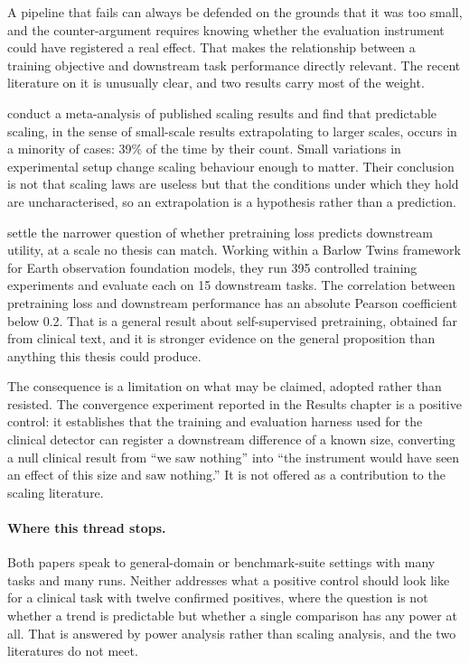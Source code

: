 A pipeline that fails can always be defended on the grounds that it was too small, and the
counter-argument requires knowing whether the evaluation instrument could have registered a
real effect. That makes the relationship between a training objective and downstream task
performance directly relevant. The recent literature on it is unusually clear, and two
results carry most of the weight.

\citet{lourie2025scaling} conduct a meta-analysis of published scaling results and find that
predictable scaling, in the sense of small-scale results extrapolating to larger scales,
occurs in a minority of cases: 39\% of the time by their count. Small variations in
experimental setup change scaling behaviour enough to matter. Their conclusion is not that
scaling laws are useless but that the conditions under which they hold are uncharacterised,
so an extrapolation is a hypothesis rather than a prediction.

\citet{feng2026tessera} settle the narrower question of whether pretraining loss predicts
downstream utility, at a scale no thesis can match. Working within a Barlow Twins framework
for Earth observation foundation models, they run 395 controlled training experiments and
evaluate each on 15 downstream tasks. The correlation between pretraining loss and downstream
performance has an absolute Pearson coefficient below 0.2. That is a general result about
self-supervised pretraining, obtained far from clinical text, and it is stronger evidence on
the general proposition than anything this thesis could produce.

The consequence is a limitation on what may be claimed, adopted rather than resisted. The
convergence experiment reported in the Results chapter is a positive control: it establishes
that the training and evaluation harness used for the clinical detector can register a
downstream difference of a known size, converting a null clinical result from ``we saw
nothing'' into ``the instrument would have seen an effect of this size and saw nothing.'' It
is not offered as a contribution to the scaling literature.

\paragraph{Where this thread stops.} Both papers speak to general-domain or benchmark-suite
settings with many tasks and many runs. Neither addresses what a positive control should look
like for a clinical task with twelve confirmed positives, where the question is not whether a
trend is predictable but whether a single comparison has any power at all. That is answered
by power analysis rather than scaling analysis, and the two literatures do not meet.

